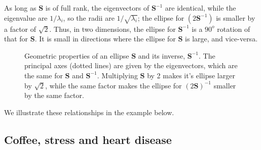\documentclass[
  letterpaper,
  10pt,
  krantz2]{krantz}
\begin{document}
{As long as \(\mathbf{S}\) is of full rank, the eigenvectors of
\(\mathbf{S}^{-1}\) are identical, while the eigenvalue are
\(1 / \lambda_i\), so the radii are \(1 / \sqrt{\lambda_i}\); the
ellipse for \((2 \mathbf{S}^{-1})\) is smaller by a factor of
\(\sqrt{2}\). Thus, in two dimensions, the ellipse for
\(\mathbf{S}^{-1}\) is a \(90^o\) rotation of that for \(\mathbf{S}\).
It is small in directions where the ellipse for \(\mathbf{S}\) is large,
and vice-versa.

\begin{figure}


\caption{\label{fig-inverse}Geometric properties of an ellipse
\(\mathbf{S}\) and its inverse, \(\mathbf{S}^{-1}\). The principal axes
(dotted lines) are given by the eigenvectors, which are the same for
\(\mathbf{S}\) and \(\mathbf{S}^{-1}\). Multiplying \(\mathbf{S}\) by 2
makes it's ellipse larger by \(\sqrt{2}\), while the same factor makes
the ellipse for \((2 \mathbf{S})^{-1}\) smaller by the same factor.}

\end{figure}%

We illustrate these relationships in the example below.

\subsection{Coffee, stress and heart
disease}\label{coffee-stress-and-heart-disease}

}
\end{document}
